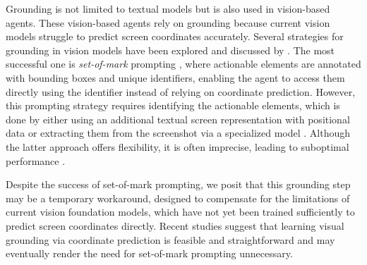 Grounding is not limited to textual models but is also used in vision-based agents.
These vision-based agents rely on grounding because current vision models struggle to predict screen coordinates accurately. Several strategies for grounding in vision models have been explored and discussed by \citet{zheng_gpt-4vision_2024}.
The most successful one is \emph{set-of-mark} prompting \citep{yang_set--mark_2023}, where actionable elements are annotated with bounding boxes and unique identifiers, enabling the agent to access them directly using the identifier instead of relying on coordinate prediction.
However, this prompting strategy requires identifying the actionable elements, which is done by either using an additional textual screen representation with positional data  or extracting them from the screenshot via a specialized model . 
Although the latter approach offers flexibility, it is often imprecise, leading to suboptimal performance \citep{bonatti_windows_2024}.

Despite the success of set-of-mark prompting, we posit that this grounding step may be a temporary workaround, designed to compensate for the limitations of current vision foundation models, which have not yet been trained sufficiently to predict screen coordinates directly. Recent studies suggest that learning visual grounding via coordinate prediction is feasible and straightforward \citep{dardouri_visual_2024, cheng_seeclick_2024} and may eventually render the need for set-of-mark prompting unnecessary.



